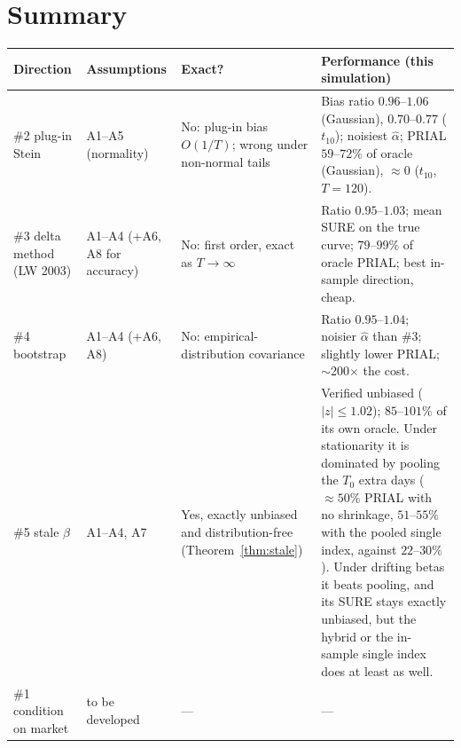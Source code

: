 \documentclass[11pt]{article}
\theoremstyle{remark}
\begin{document}
\section{Summary}

\begin{table}[h]
\centering
\small
\begin{tabular}{@{}>{\raggedright\arraybackslash}p{2.6cm}>{\raggedright\arraybackslash}p{2.9cm}>{\raggedright\arraybackslash}p{3.4cm}>{\raggedright\arraybackslash}p{6.1cm}@{}}
\toprule
Direction & Assumptions & Exact? & Performance (this simulation) \\
\midrule
\#2 plug-in Stein & A1--A5 (normality) & No: plug-in bias $O(1/T)$; wrong under non-normal tails & Bias ratio $0.96$--$1.06$ (Gaussian), $0.70$--$0.77$ ($t_{10}$); noisiest $\hat\alpha$; PRIAL $59$--$72\%$ of oracle (Gaussian), $\approx 0$ ($t_{10}$, $T = 120$). \\
\#3 delta method (LW 2003) & A1--A4 (+A6, A8 for accuracy) & No: first order, exact as $T \to \infty$ & Ratio $0.95$--$1.03$; mean SURE on the true curve; $79$--$99\%$ of oracle PRIAL; best in-sample direction, cheap. \\
\#4 bootstrap & A1--A4 (+A6, A8) & No: empirical-distribution covariance & Ratio $0.95$--$1.04$; noisier $\hat\alpha$ than \#3; slightly lower PRIAL; $\sim$200$\times$ the cost. \\
\#5 stale $\beta$ & A1--A4, A7 & Yes, exactly unbiased and distribution-free (Theorem~\ref{thm:stale}) & Verified unbiased ($|z| \le 1.02$); $85$--$101\%$ of its own oracle. Under stationarity it is dominated by pooling the $T_0$ extra days ($\approx 50\%$ PRIAL with no shrinkage, $51$--$55\%$ with the pooled single index, against $22$--$30\%$). Under drifting betas it beats pooling, and its SURE stays exactly unbiased, but the hybrid or the in-sample single index does at least as well. \\
\#1 condition on market & to be developed & --- & --- \\
\bottomrule
\end{tabular}
\end{table}
\end{document}
